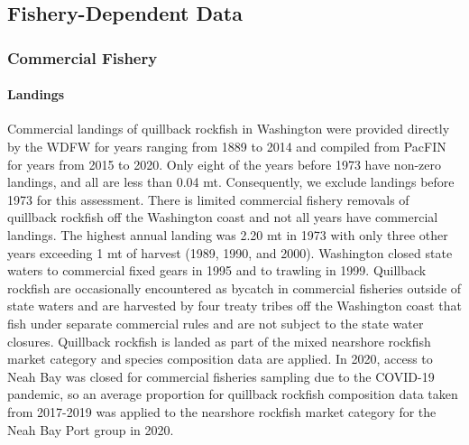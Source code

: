 \documentclass[11pt,
  english,
  letterpaper,
]{article}
\begin{document}
\leavevmode\tagmcend\tagstructend\par


\hypertarget{fishery-dependent-data}{%
\subsection{Fishery-Dependent Data}\label{fishery-dependent-data}}

\leavevmode\tagmcend\tagstructend


\hypertarget{commercial-fishery}{%
\subsubsection{Commercial Fishery}\label{commercial-fishery}}

\leavevmode\tagmcend\tagstructend


\hypertarget{landings}{%
\paragraph{Landings}\label{landings}}

\leavevmode\tagmcend\tagstructend


Commercial landings of quillback rockfish in Washington were provided directly by the WDFW for years ranging from 1889 to 2014 and compiled from PacFIN for years from 2015 to 2020. Only eight of the years before 1973 have non-zero landings, and all are less than 0.04 mt. Consequently, we exclude landings before 1973 for this assessment. There is limited commercial fishery removals of quillback rockfish off the Washington coast and not all years have commercial landings. The highest annual landing was 2.20 mt in 1973 with only three other years exceeding 1 mt of harvest (1989, 1990, and 2000). Washington closed state waters to commercial fixed gears in 1995 and to trawling in 1999. Quillback rockfish are occasionally encountered as bycatch in commercial fisheries outside of state waters and are harvested by four treaty tribes off the Washington coast that fish under separate commercial rules and are not subject to the state water closures. Quillback rockfish is landed as part of the mixed nearshore rockfish market category and species composition data are applied. In 2020, access to Neah Bay was closed for commercial fisheries sampling due to the COVID-19 pandemic, so an average proportion for quillback rockfish composition data taken from 2017-2019 was applied to the nearshore rockfish market category for the Neah Bay Port group in 2020.
\end{document}
